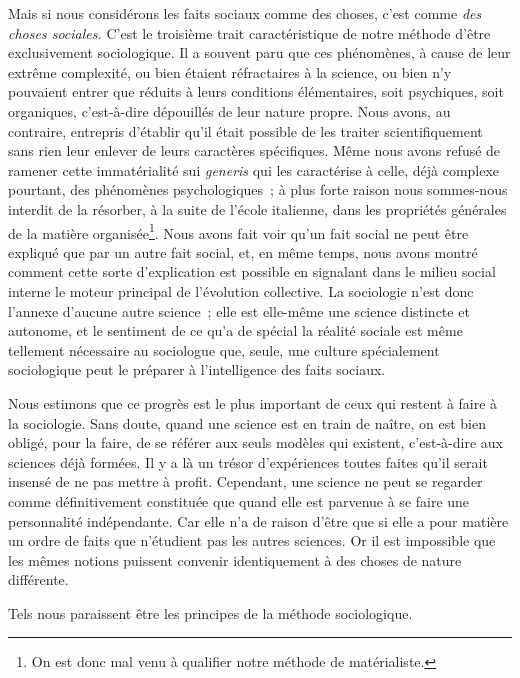 \documentclass[french,twoside]{book} %
\begin{document}
Mais si nous considérons les faits sociaux comme des choses, c’est comme {\itshape des choses sociales.} C’est le troisième trait caractéristique de notre méthode d’être exclusivement sociologique. Il a souvent paru que ces phénomènes, à cause de leur extrême complexité, ou bien étaient réfractaires à la science, ou bien n’y pouvaient entrer que réduits à leurs conditions élémentaires, soit psychiques, soit organiques, c’est-à-dire dépouillés de leur nature propre. Nous avons, au contraire, entrepris d’établir qu’il était possible de les traiter scientifiquement sans rien leur enlever de leurs caractères spécifiques. Même nous avons refusé de ramener cette immatérialité sui {\itshape generis} qui les caractérise à celle, déjà complexe pourtant, des phénomènes psychologiques ; à plus forte raison nous sommes-nous interdit de la résorber, à la suite de l’école italienne, dans les propriétés générales de la matière organisée\footnote{ On est donc mal venu à qualifier notre méthode de matérialiste.}. Nous avons fait voir qu’un fait social ne peut être expliqué que par un autre fait social, et, en même temps, nous avons montré comment cette sorte d’explication est possible en signalant dans le milieu social interne le moteur principal de l’évolution collective. La sociologie n’est donc l’annexe d’aucune autre science ; elle est elle-même une science distincte et autonome, et le sentiment de ce qu’a de spécial la réalité sociale est même tellement nécessaire au sociologue que, seule, une culture spécialement sociologique peut le préparer à l’intelligence des faits sociaux.\par
Nous estimons que ce progrès est le plus important de ceux qui restent à faire à la sociologie. Sans doute, quand une science est en train de naître, on est bien obligé, pour la faire, de se référer aux seuls modèles qui existent, c’est-à-dire aux sciences déjà formées. Il y a là un trésor d’expériences toutes faites qu’il serait insensé de ne pas mettre à profit. Cependant, une science ne peut se regarder comme définitivement constituée que quand elle est parvenue à se faire une personnalité indépendante. Car elle n’a de raison d’être que si elle a pour matière un ordre de faits que n’étudient pas les autres sciences. Or il est impossible que les mêmes notions puissent convenir identiquement à des choses de nature différente.\par
Tels nous paraissent être les principes de la méthode sociologique.\par
\end{document}
